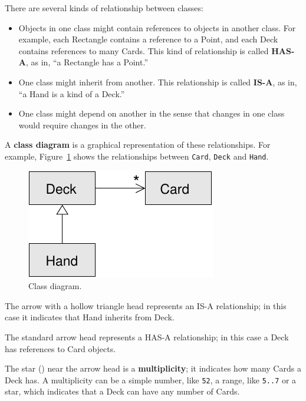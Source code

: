 \documentclass[12pt,a4paper,final,twoside,onecolumn,titlepage]{book}
\begin{document}
There are several kinds of relationship between classes:

\begin{itemize}

\item Objects in one class might contain references to objects
in another class.  For example, each Rectangle contains a reference
to a Point, and each Deck contains references to many Cards.
This kind of relationship is called {\bf HAS-A}, as in, ``a Rectangle
has a Point.''

\item One class might inherit from another.  This relationship
is called {\bf IS-A}, as in, ``a Hand is a kind of a Deck.''

\item One class might depend on another in the sense that changes
in one class would require changes in the other.

\end{itemize}

A {\bf class diagram} is a graphical representation of these
relationships.  For example, Figure~\ref{fig.class1} shows the
relationships between {\tt Card}, {\tt Deck} and {\tt Hand}.

\begin{figure}
\centerline
{\includegraphics[scale=0.8]{figs/class1.pdf}}
\caption{Class diagram.}
\label{fig.class1}
\end{figure}


The arrow with a hollow triangle head represents an IS-A
relationship; in this case it indicates that Hand inherits
from Deck.

The standard arrow head represents a HAS-A
relationship; in this case a Deck has references to Card
objects.

The star ({\tt *}) near the arrow head is a 
{\bf multiplicity}; it indicates how many Cards a Deck has.
A multiplicity can be a simple number, like {\tt 52}, a range,
like {\tt 5..7} or a star, which indicates that a Deck can
have any number of Cards.
\end{document}
